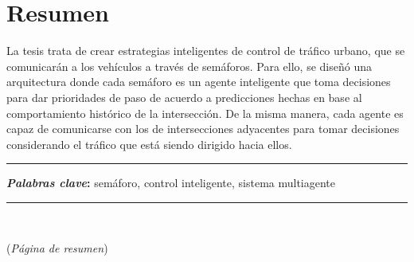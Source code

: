 \chapter*{Resumen} %
  La tesis trata de crear estrategias inteligentes de control de tráfico
  urbano, que se comunicarán a los vehículos a través de semáforos. Para
  ello, se diseñó una arquitectura donde cada semáforo es un agente
  inteligente que toma decisiones para dar prioridades de paso de
  acuerdo a predicciones hechas en base al comportamiento histórico de
  la intersección. De la misma manera, cada agente es capaz de
  comunicarse con los de intersecciones adyacentes para tomar decisiones
  considerando el tráfico que está siendo dirigido hacia ellos.
\noindent \rule{0.9\textwidth}{1.0pt} \newline
\noindent \textbf{\textit{Palabras clave}: }\newline
  semáforo, control inteligente, sistema multiagente
\noindent \rule{0.9\textwidth}{1.0pt}
\ \newline
\par
\linespread{1.3}
{\Huge{(\textit{Página de resumen})}}
\clearpage %
